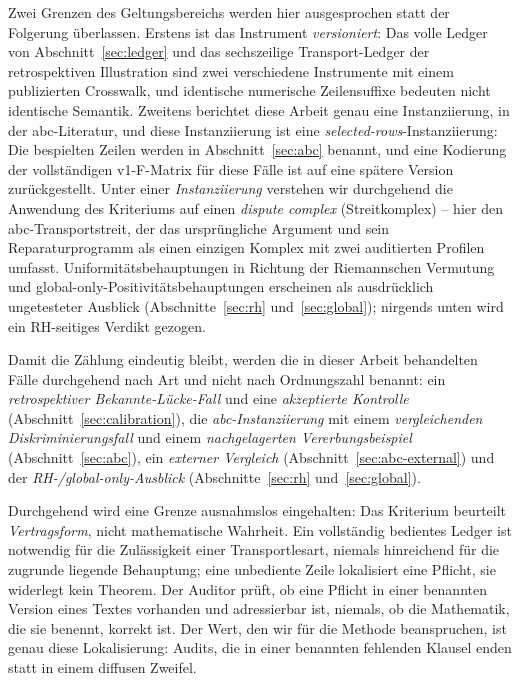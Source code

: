 \documentclass[11pt,a4paper]{article}
\begin{document}
Zwei Grenzen des Geltungsbereichs werden hier ausgesprochen statt der
Folgerung überlassen. Erstens ist das Instrument \emph{versioniert}: Das
volle Ledger von Abschnitt~\ref{sec:ledger} und das sechszeilige
Transport-Ledger der retrospektiven Illustration sind zwei verschiedene
Instrumente mit einem publizierten Crosswalk, und identische numerische
Zeilensuffixe bedeuten nicht identische Semantik. Zweitens berichtet diese
Arbeit genau eine Instanziierung, in der abc-Literatur, und diese
Instanziierung ist eine \emph{selected-rows}-Instanziierung: Die bespielten
Zeilen werden in Abschnitt~\ref{sec:abc} benannt, und eine Kodierung der
vollständigen v1-F-Matrix für diese Fälle ist auf eine spätere Version
zurückgestellt. Unter einer \emph{Instanziierung} verstehen wir durchgehend
die Anwendung des Kriteriums auf einen \emph{dispute complex}
(Streitkomplex) -- hier den abc-Transportstreit, der das ursprüngliche
Argument und sein Reparaturprogramm als einen einzigen Komplex mit zwei
auditierten Profilen umfasst. Uniformitätsbehauptungen in Richtung der
Riemannschen Vermutung und global-only-Positivitätsbehauptungen erscheinen
als ausdrücklich ungetesteter Ausblick (Abschnitte~\ref{sec:rh}
und~\ref{sec:global}); nirgends unten wird ein RH-seitiges Verdikt gezogen.

Damit die Zählung eindeutig bleibt, werden die in dieser Arbeit behandelten
Fälle durchgehend nach Art und nicht nach Ordnungszahl benannt: ein
\emph{retrospektiver Bekannte-Lücke-Fall} und eine \emph{akzeptierte
Kontrolle} (Abschnitt~\ref{sec:calibration}), die \emph{abc-Instanziierung}
mit einem \emph{vergleichenden Diskriminierungsfall} und einem
\emph{nachgelagerten Vererbungsbeispiel} (Abschnitt~\ref{sec:abc}), ein
\emph{externer Vergleich} (Abschnitt~\ref{sec:abc-external}) und der
\emph{RH-/global-only-Ausblick} (Abschnitte~\ref{sec:rh}
und~\ref{sec:global}).

Durchgehend wird eine Grenze ausnahmslos eingehalten: Das Kriterium
beurteilt \emph{Vertragsform}, nicht mathematische Wahrheit. Ein vollständig
bedientes Ledger ist notwendig für die Zulässigkeit einer Transportlesart,
niemals hinreichend für die zugrunde liegende Behauptung; eine unbediente
Zeile lokalisiert eine Pflicht, sie widerlegt kein Theorem. Der Auditor
prüft, ob eine Pflicht in einer benannten Version eines Textes vorhanden und
adressierbar ist, niemals, ob die Mathematik, die sie benennt, korrekt ist.
Der Wert, den wir für die Methode beanspruchen, ist genau diese
Lokalisierung: Audits, die in einer benannten fehlenden Klausel enden statt
in einem diffusen Zweifel.
\end{document}
